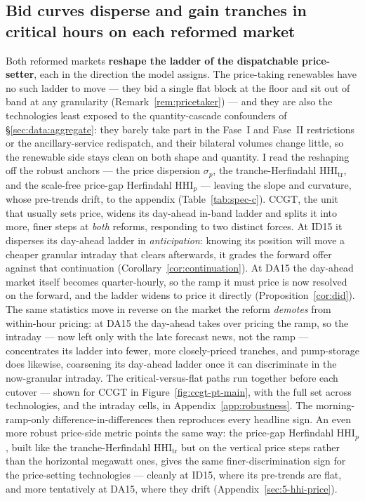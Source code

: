 \documentclass[11pt,a4paper]{article}
\theoremstyle{definition}
\theoremstyle{remark}
\theoremstyle{plain}
\begin{document}
\subsection{Bid curves disperse and gain tranches in critical hours on each reformed market}\label{sec:results:6-1}

Both reformed markets \textbf{reshape the ladder of the dispatchable price-setter}, each in the direction the model assigns. The price-taking renewables have no such ladder to move --- they bid a single flat block at the floor and sit out of band at any granularity (Remark~\ref{rem:pricetaker}) --- and they are also the technologies least exposed to the quantity-cascade confounders of \S\ref{sec:data:aggregate}: they barely take part in the Fase~I and Fase~II restrictions or the ancillary-service redispatch, and their bilateral volumes change little, so the renewable side stays clean on both shape and quantity. I read the reshaping off the robust anchors --- the price dispersion $\sigma_p$, the tranche-Herfindahl $\text{HHI}_{\text{tr}}$, and the scale-free price-gap Herfindahl $\text{HHI}_p$ --- leaving the slope and curvature, whose pre-trends drift, to the appendix (Table~\ref{tab:spec-c}). CCGT, the unit that usually sets price, widens its day-ahead in-band ladder and splits it into more, finer steps at \emph{both} reforms, responding to two distinct forces. At ID15 it disperses its day-ahead ladder in \emph{anticipation}: knowing its position will move a cheaper granular intraday that clears afterwards, it grades the forward offer against that continuation (Corollary~\ref{cor:continuation}). At DA15 the day-ahead market itself becomes quarter-hourly, so the ramp it must price is now resolved on the forward, and the ladder widens to price it directly (Proposition~\ref{cor:did}). The same statistics move in reverse on the market the reform \emph{demotes} from within-hour pricing: at DA15 the day-ahead takes over pricing the ramp, so the intraday --- now left only with the late forecast news, not the ramp --- concentrates its ladder into fewer, more closely-priced tranches, and pump-storage does likewise, coarsening its day-ahead ladder once it can discriminate in the now-granular intraday.
  The critical-versus-flat paths run together before each cutover --- shown for CCGT in Figure~\ref{fig:ccgt-pt-main}, with the full set across technologies, and the intraday cells, in Appendix~\ref{app:robustness}. The morning-ramp-only difference-in-differences then reproduces every headline sign. An even more robust price-side metric points the same way: the price-gap Herfindahl $\text{HHI}_p$, built like the tranche-Herfindahl $\text{HHI}_{\text{tr}}$ but on the vertical price steps rather than the horizontal megawatt ones, gives the same finer-discrimination sign for the price-setting technologies --- cleanly at ID15, where its pre-trends are flat, and more tentatively at DA15, where they drift (Appendix~\ref{sec:5-hhi-price}).
\end{document}
